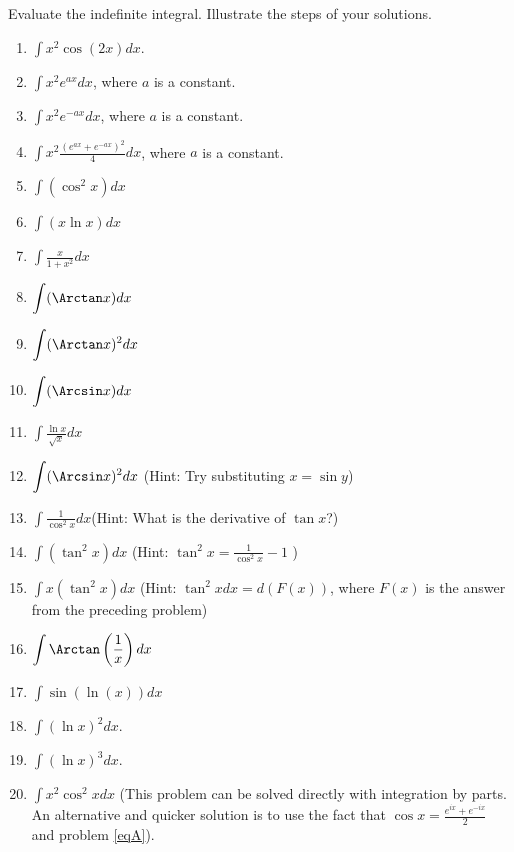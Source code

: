 Evaluate the indefinite integral. Illustrate the steps of your solutions.
\begin{multicols}{2}
\begin{enumerate}
\item $\displaystyle\int x^2\cos (2x) dx$.
\item 
$\displaystyle\int x^2e^{ax} dx$, where $a$ is a constant.
\item 
$\displaystyle\int x^2e^{-ax}dx$, where $a$ is a constant.
\item \label{eqA}
$\displaystyle\int x^2\frac{(e^{ax}+e^{-ax})^2}4dx$, where $a$ is a constant. 
\item 
$\displaystyle\int (\cos^2x) dx$ 
\item 
$\displaystyle \int (x\ln x )dx $
\item $\displaystyle\int \frac{x}{1+x^2} dx$ 
\item 
$\displaystyle \int (\Arctan x) dx$
\item 
$\displaystyle \int (\Arctan x)^2 dx$
\item 
$\displaystyle \int (\Arcsin x) dx
$
\item $\displaystyle\int \frac{\ln x}{\sqrt{x}}dx $
\item $\displaystyle\int (\Arcsin x)^2 dx $ \quad \quad (Hint: Try substituting $x=\sin y$)
\item $\displaystyle\int \frac{1}{\cos^2 x}dx$\quad \quad (Hint: What is the derivative of $\tan x$?)
\item $\displaystyle\int (\tan^2 x) dx $ \quad \quad (Hint: $\tan^2 x = \frac{1}{\cos^2x }-1$ )
\item $\displaystyle\int x(\tan^2 x) dx $ \quad \quad (Hint: $\tan^2 x dx= d(F(x))$, where $F(x)$ is the answer from the preceding problem)
\item 
$\displaystyle
\int\Arctan \left(\frac{1}x\right)dx
$
\item $\displaystyle\int \sin (\ln (x)) dx $
\item $\displaystyle\int (\ln x)^2 dx$.
\item $\displaystyle\int (\ln x)^3 dx$.
\item $\displaystyle\int x^2\cos^2x dx$ (This problem can be solved directly with integration by parts. An alternative and quicker solution is to use the fact that $\cos x= \frac{ e^{ix} + e^{-ix}}{2}$ and problem \ref{eqA}).
\end{enumerate}
\end{multicols}